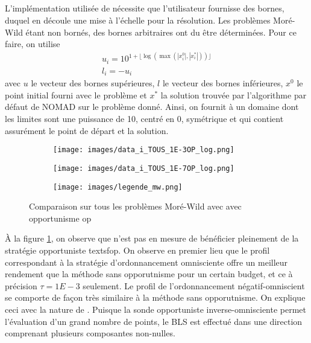 \subsection{\imfil}\label{sec:cim}
L'implémentation utilisée de \imfil nécessite que l'utilisateur fournisse des bornes, duquel en découle une mise à l'échelle pour la résolution. Les problèmes Moré-Wild étant non bornés, des bornes arbitraires ont du être déterminées. Pour ce faire, on utilise
\begin{gather*}
	u_i = 10^{1+\lfloor\log(\max(|x_i^0|,|x_i^*|))\rfloor}\\
	l_i=-u_i
\end{gather*}
avec $u$ le vecteur des bornes supérieures, $l$ le vecteur des bornes inférieures, $x^0$ le point initial fourni avec le problème et $x^*$ la solution trouvée par l'algorithme \MADS par défaut de NOMAD sur le problème donné. Ainsi, on fournit à \imfil un domaine dont les limites sont une puissance de 10, centré en 0, symétrique et qui contient assurément le point de départ et la solution.
\begin{figure}[!htb]
	\centering
	\begin{subfigure}{0.43\textwidth}
		\texttt{[image: images/data\_i\_TOUS\_1E-3OP\_log.png]}
	\end{subfigure}
	\begin{subfigure}{0.43\textwidth}
		\texttt{[image: images/data\_i\_TOUS\_1E-7OP\_log.png]}
	\end{subfigure}
	\smallskip
	\begin{subfigure}{0.95\textwidth}
		\texttt{[image: images/legende\_mw.png]}
	\end{subfigure}
	\caption{Comparaison sur tous les problèmes Moré-Wild avec \imfil avec opportunisme \textsf{op}}
	\label{fig:i_mw_op}
\end{figure}
À la figure \ref{fig:i_mw_op}, on observe que \imfil n'est pas en mesure de bénéficier pleinement de la stratégie opportuniste textsf{op}. On observe en premier lieu que le profil correspondant à la stratégie d'ordonnancement omnisciente offre un meilleur rendement que la méthode sans opporutnisme pour un certain budget, et ce à précision $\tau = 1E-3$ seulement. Le profil de l'ordonnancement négatif-omniscient se comporte de façon très similaire à la méthode sans opporutnisme. On explique ceci avec la nature de \imfil. Puisque la sonde opportuniste inverse-omnisciente permet l'évaluation d'un grand nombre de points, le \textsf{BLS} est effectué dans une direction comprenant plusieurs composantes non-nulles.  

